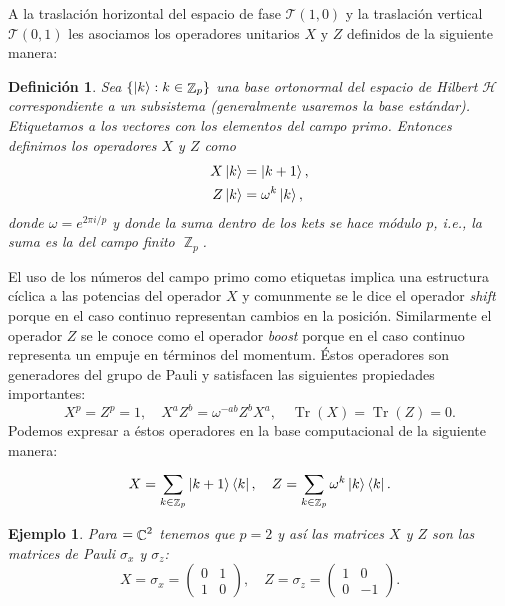 \documentclass[a4paper]{report}
\DeclareMathOperator{\C}{\mathbb{C}}
\DeclareMathOperator{\Z}{\mathbb{Z}}
\let\H\relax
\DeclareMathOperator{\H}{\mathcal H}
\DeclareMathOperator{\Tr}{Tr}
\newtheorem{definition}{Definición}
\newtheorem{example}{Ejemplo}
\begin{document}
  A la traslación horizontal del espacio de fase $\mathcal
  T(1,0)$ y la traslación vertical $\mathcal T(0,1)$ les
  asociamos los operadores unitarios $X$ y $Z$ definidos de
  la siguiente manera:
  \begin{definition}
    Sea $\{\ket k : k \in \Z_p\}$ una base ortonormal del
    espacio de Hilbert $\mathcal H$ correspondiente a un
    subsistema (generalmente usaremos la base estándar).
    Etiquetamos a los vectores con los elementos del campo
    primo. Entonces definimos los operadores $X$ y $Z$ como
    \begin{align}
      X \ket k
      &= \ket{k + 1}, \\
      Z \ket k
      &= \omega^{k} \ket k,
    \end{align}
    donde $\omega = e^{2\pi i / p}$ y donde la suma dentro
    de los kets se hace módulo $p$, i.e., la suma es la del
    campo finito $\Z_p$.
  \end{definition}
  El uso de los números del campo primo como etiquetas
  implica una estructura cíclica a las potencias del
  operador $X$ y comunmente se le dice el operador
  \textit{shift} porque en el caso continuo representan
  cambios en la posición. Similarmente el operador $Z$ se le
  conoce como el operador \textit{boost} porque en el caso
  continuo representa un empuje en términos del momentum.
  Éstos operadores son generadores del grupo de Pauli y
  satisfacen las siguientes propiedades importantes:
  \begin{equation}
    X^{p} = Z^{p} = 1,
    \quad
    X^{a} Z^{b} = \omega^{-ab} Z^{b} X^{a},
    \quad
    \Tr(X) = \Tr(Z) = 0.
  \end{equation}
  Podemos expresar a éstos operadores en la base
  computacional de la siguiente manera:
  \begin{equation}
    X = \sum_{k \in \Z_p}^{} \ket{k+1}\bra{k}, \\
    \quad
    Z = \sum_{k \in \Z_p}^{} \omega^{k} \ket k \bra k.
  \end{equation}
  \begin{example}
    Para $\H = \C^{2}$ tenemos que $p = 2$ y así las
    matrices $X$ y $Z$ son las matrices de Pauli $\sigma_x$
    y $\sigma_z$:
    \[
      X = \sigma_x =
      \begin{pmatrix} 0 & 1 \\ 1 & 0 \end{pmatrix},
      \quad
      Z = \sigma_z =
      \begin{pmatrix} 1 & 0 \\ 0 & -1 \end{pmatrix}. 
    \] 
  \end{example}
\end{document}
